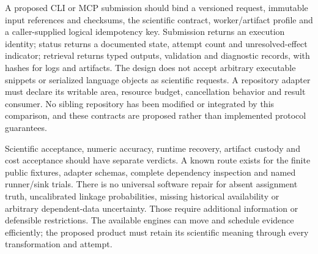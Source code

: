 A proposed CLI or MCP submission should bind a versioned request, immutable input references and checksums, the scientific contract, worker/artifact profile and a caller-supplied logical idempotency key. Submission returns an execution identity; status returns a documented state, attempt count and unresolved-effect indicator; retrieval returns typed outputs, validation and diagnostic records, with hashes for logs and artifacts. The design does not accept arbitrary executable snippets or serialized language objects as scientific requests. A repository adapter must declare its writable area, resource budget, cancellation behavior and result consumer. No sibling repository has been modified or integrated by this comparison, and these contracts are proposed rather than implemented protocol guarantees.\citep{exec24_openlineage_source,exec24_openlineage_reference,exec25_dww_choice}

Scientific acceptance, numeric accuracy, runtime recovery, artifact custody and cost acceptance should have separate verdicts. A known route exists for the finite public fixtures, adapter schemas, complete dependency inspection and named runner/sink trials. There is no universal software repair for absent assignment truth, uncalibrated linkage probabilities, missing historical availability or arbitrary dependent-data uncertainty. Those require additional information or defensible restrictions. The available engines can move and schedule evidence efficiently; the proposed product must retain its scientific meaning through every transformation and attempt.\citep{exec25_dww_choice}
